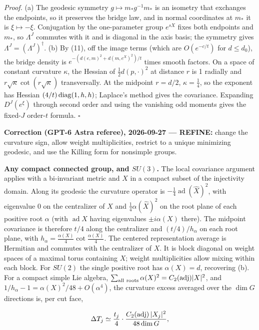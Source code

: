 \documentclass[11pt,a4paper]{article}
\begin{document}
\emph{Proof.} (a) The geodesic symmetry \(g\mapsto m_*g^{-1}m_*\) is an
isometry that exchanges the endpoints, so it preserves the bridge law,
and in normal coordinates at \(m_*\) it is \(\xi\mapsto-\xi\).
Conjugation by the one-parameter group \(e^{sX}\) fixes both endpoints
and \(m_*\), so \(\Lambda^J\) commutes with it and is diagonal in the
axis basis; the symmetry gives \(\Lambda^J=(\Lambda^J)^\dagger\). (b) By
(11), off the image terms (which are \(O(e^{-c/t})\) for \(d\le d_0\)),
the bridge density is \(e^{-(d(e,m)^2+d(m,e^X)^2)/t}\) times smooth
factors. On a space of constant curvature \(\kappa\), the Hessian of
\(\frac12d(p,\cdot)^2\) at distance \(r\) is 1 radially and
\(r\sqrt\kappa\cot(r\sqrt\kappa)\) transversally. At the midpoint
\(r=d/2\), \(\kappa=\frac14\), so the exponent has Hessian
\((4/t)\,{\rm diag}(1,h,h)\); Laplace's method gives the covariance.
Expanding \(D^J(e^\xi)\) through second order and using the vanishing
odd moments gives the fixed-\(J\) order-\(t\) formula. \(\square\)

\textbf{Correction (GPT-6 Astra referee), 2026-09-27 --- REFINE:} change
the curvature sign, allow weight multiplicities, restrict to a unique
minimizing geodesic, and use the Killing form for nonsimple groups.

\textbf{Any compact connected group, and \(SU(3)\).} The local
covariance argument applies with a bi-invariant metric and \(X\) in a
compact subset of the injectivity domain. Along its geodesic the
curvature operator is \(-\frac14\operatorname{ad}(\hat X)^2\), with
eigenvalue \(0\) on the centralizer of \(X\) and
\(\frac14\alpha(\hat X)^2\) on the root plane of each positive root
\(\alpha\) (with \(\operatorname{ad}X\) having eigenvalues
\(\pm i\alpha(X)\) there). The midpoint covariance is therefore \(t/4\)
along the centralizer and \((t/4)/h_\alpha\) on each root plane, with
\(h_\alpha=\frac{\alpha(X)}4\cot\frac{\alpha(X)}4\). The centered
representation average is Hermitian and commutes with the centralizer of
\(X\). It is block diagonal on weight spaces of a maximal torus
containing \(X\); weight multiplicities allow mixing within each block.
For \(SU(2)\) the single positive root has \(\alpha(X)=d\), recovering
(b). For a compact simple Lie algebra,
\(\sum_{\rm all\ roots}\alpha(X)^2=C_2({\rm adj})|X|^2\), and
\(1/h_\alpha-1=\alpha(X)^2/48+O(\alpha^4)\), the curvature excess
averaged over the \(\dim G\) directions is, per cut face,

\[\Delta T_j\simeq\frac{t_j}4\cdot\frac{C_2({\rm adj})\,|X_j|^2}{48\dim G},\]
\end{document}
